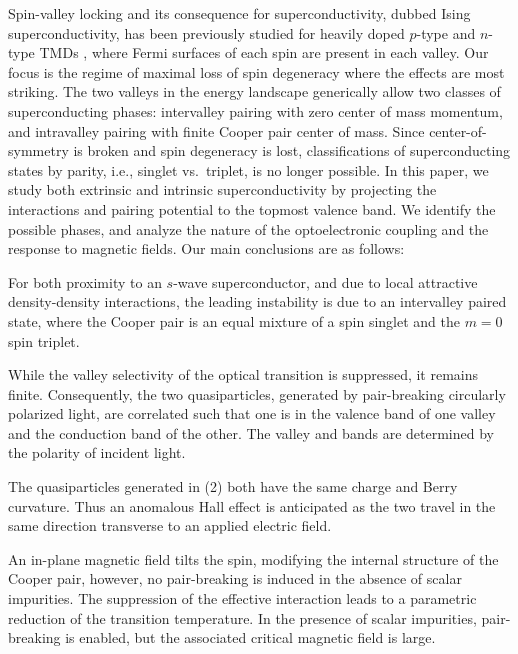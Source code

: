 Spin-valley locking and its consequence for superconductivity,
dubbed Ising superconductivity, has been previously studied
for heavily doped $p$-type and $n$-type TMDs
\cite{%
  1510.06289v2,%
  PhysRevLett.113.097001%
},
where Fermi surfaces of each spin are present in each valley.
Our focus is the regime of maximal loss of spin degeneracy where the
effects are most striking.
The two valleys in the energy landscape generically allow
two classes of superconducting phases:
intervalley pairing with zero center of mass momentum,
and intravalley pairing with finite Cooper pair center of mass.
Since center-of-symmetry is broken and spin degeneracy is lost,
classifications of superconducting states by parity,
i.e., singlet vs.\ triplet, is no longer possible.
In this paper, we study both extrinsic and intrinsic superconductivity
by projecting the interactions and pairing potential to
the topmost valence band.
We identify the possible phases, and analyze the nature
of the optoelectronic coupling and the response to magnetic fields.
Our main conclusions are as follows:

\introparanum{}
For both proximity to an $s$-wave superconductor,
and due to local attractive density-density interactions,
the leading instability is due to an intervalley paired state,
where the Cooper pair is an equal mixture
of a spin singlet and the $m = 0$ spin triplet.

\introparanum{}
While the valley selectivity of the optical transition is suppressed,
it remains finite.
Consequently, the two quasiparticles,
generated by pair-breaking circularly polarized light,
are correlated such that one is in the valence band of one valley
and the conduction band of the other.
The valley and bands are determined by the polarity of incident light.

\introparanum{}
The quasiparticles generated in (2)
both have the same charge and Berry curvature.
Thus an anomalous Hall effect is anticipated
as the two travel in the same direction transverse to an applied electric field.

\introparanum{}
An in-plane magnetic field tilts the spin,
modifying the internal structure of the Cooper pair,
however, no pair-breaking is induced in the absence of scalar impurities.
The suppression of the effective interaction leads
to a parametric reduction of the transition temperature.
In the presence of scalar impurities, pair-breaking is enabled,
but the associated critical magnetic field is large.

